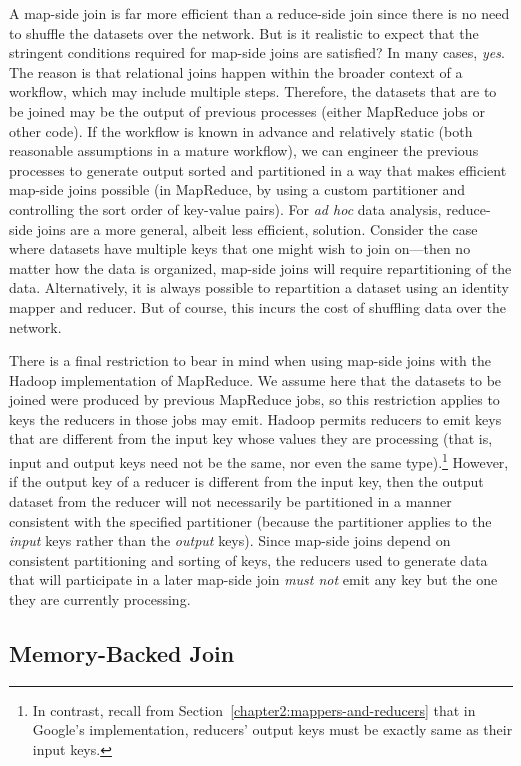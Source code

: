 A map-side join is far more efficient than a reduce-side join since
there is no need to shuffle the datasets over the network.  But is it
realistic to expect that the stringent conditions required for
map-side joins are satisfied?  In many cases, \emph{yes}.  The reason
is that relational joins happen within the broader context of a
workflow, which may include multiple steps.  Therefore, the datasets
that are to be joined may be the output of previous processes (either
MapReduce jobs or other code).  If the workflow is known in advance
and relatively static (both reasonable assumptions in a mature
workflow), we can engineer the previous processes to generate
output sorted and partitioned in a way that makes efficient map-side
joins possible (in MapReduce, by using a custom partitioner and
controlling the sort order of key-value pairs).  For \emph{ad hoc} data
analysis, reduce-side joins are a more general, albeit less efficient,
solution.  Consider the case where datasets have multiple keys that
one might wish to join on---then no matter how the data is organized,
map-side joins will require repartitioning of the data.
Alternatively, it is always possible to repartition a dataset using an
identity mapper and reducer.  But of course, this incurs the cost of
shuffling data over the network.

There is a final restriction to bear in mind when using map-side joins
with the Hadoop implementation of MapReduce.  We assume here that the
datasets to be joined were produced by previous MapReduce jobs, so
this restriction applies to keys the reducers in those jobs may emit.
Hadoop permits reducers to emit keys that are different from the
input key whose values they are processing (that is, input and output
keys need not be the same, nor even the same type).\footnote{In
  contrast, recall from Section~\ref{chapter2:mappers-and-reducers}
  that in Google's implementation, reducers' output keys must be
  exactly same as their input keys.}  However, if the output key of a
reducer is different from the input key, then the output dataset from
the reducer will not necessarily be partitioned in a manner consistent
with the specified partitioner (because the partitioner applies to the
\emph{input} keys rather than the \emph{output} keys).  Since map-side
joins depend on consistent partitioning and sorting of keys, the
reducers used to generate data that will participate in a later
map-side join \emph{must not} emit any key but the one they are
currently processing.

\subsection{Memory-Backed Join}


